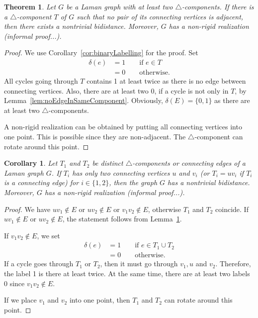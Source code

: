 \documentclass[a4paper, 11pt]{article}
\newcommand{\trcomp}{$\triangle$-component}
\newcommand{\trcomps}{$\triangle$-components}
\newtheorem{thm}{Theorem}[section]
\newtheorem{cor}[lem]{Corollary}
\theoremstyle{definition}
\begin{document}
\begin{thm}
\label{thm:componentWithNonadjacentVertices}
Let $G$ be a Laman graph with at least two \trcomps{}. If there is a \trcomp{} $T$ of $G$ such that no pair of its connecting vertices is adjacent, then there exists a nontrivial bidistance.  Moreover, $G$ has a non-rigid realization (informal proof...).
\end{thm}
\begin{proof}
We use Corollary~\ref{cor:binaryLabelling} for the proof. Set 
\begin{align*}
\delta(e)&=1 \qquad \text{if } e\in T \\
		&=0 \qquad \text{otherwise.}
\end{align*} 
All cycles going through $T$ contains 1 at least twice as there is no edge between connecting vertices. Also, there are at least two 0, if a cycle is not only in $T$, by Lemma~\ref{lem:noEdgeInSameComponent}. Obviously, $\delta(E)=\{0,1\}$ as there are at least two \trcomps{}.

A non-rigid realization can be obtained by putting all connecting vertices into one point. This is possible since they are non-adjacent. The \trcomp{} can rotate around this point.
\end{proof}

\begin{cor}
Let $T_1$ and $T_2$ be distinct \trcomps{} or connecting edges of a Laman graph $G$. If $T_i$ has only two connecting vertices $u$ and $v_i$ (or $T_i=uv_i$ if $T_i$ is a connecting edge) for $i\in\{1,2\}$, then  the graph $G$ has a nontrivial bidistance.  Moreover, $G$ has a non-rigid realization (informal proof...).
\end{cor}
\begin{proof}
We have $uv_1\notin E$ or $uv_2\notin E$ or $v_1v_2\notin E$, otherwise $T_1$ and $T_2$ coincide.
If $uv_1\notin E$ or $uv_2\notin E$, the statement follows from Lemma~\ref{thm:componentWithNonadjacentVertices}.

If $v_1v_2\notin E$, we set 
\begin{align*}
\delta(e)&=1 \qquad \text{if } e\in T_1\cup T_2 \\
		&=0 \qquad \text{otherwise.}
\end{align*} 
If a cycle goes through $T_1$ or $T_2$, then it must go through  $v_1, u$ and $v_2$. Therefore, the label 1 is there at least twice. At the same time, there are at least two labels 0 since  $v_1v_2\notin E$.

If we place $v_1$ and $v_2$ into one point, then $T_1$ and $T_2$ can rotate around this point.
\end{proof}
\end{document}
